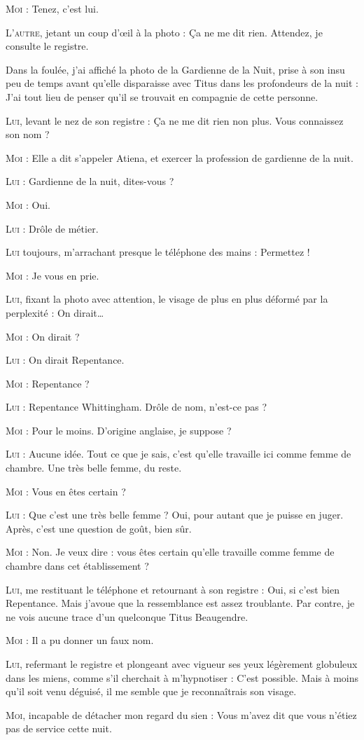 \begin{dialogue}

\textsc{Moi} : Tenez, c’est lui.

\textsc{L’autre}, jetant un coup d’œil à la photo : Ça ne me dit rien. Attendez, je consulte le registre.

Dans la foulée, j’ai affiché la photo de la Gardienne de la Nuit, prise à son insu peu de temps avant qu’elle disparaisse avec Titus dans les profondeurs de la nuit : J’ai tout lieu de penser qu’il se trouvait en compagnie de cette personne.

\textsc{Lui}, levant le nez de son registre : Ça ne me dit rien non plus. Vous connaissez son nom ?

\textsc{Moi} : Elle a dit s’appeler Atiena, et exercer la profession de gardienne de la nuit.

\textsc{Lui} : Gardienne de la nuit, dites-vous ?

\textsc{Moi} : Oui.

\textsc{Lui} : Drôle de métier.

\textsc{Lui} toujours, m’arrachant presque le téléphone des mains : Permettez !

\textsc{Moi} : Je vous en prie.

\textsc{Lui}, fixant la photo avec attention, le visage de plus en plus déformé par la perplexité : On dirait…

\textsc{Moi} : On dirait ?

\textsc{Lui} : On dirait Repentance.

\textsc{Moi} : Repentance ?

\textsc{Lui} : Repentance Whittingham. Drôle de nom, n’est-ce pas ?

\textsc{Moi} : Pour le moins. D’origine anglaise, je suppose ?

\textsc{Lui} : Aucune idée. Tout ce que je sais, c’est qu’elle travaille ici comme femme de chambre. Une très belle femme, du reste.

\textsc{Moi} : Vous en êtes certain ?

\textsc{Lui} : Que c’est une très belle femme ? Oui, pour autant que je puisse en juger. Après, c’est une question de goût, bien sûr.

\textsc{Moi} : Non. Je veux dire : vous êtes certain qu’elle travaille comme femme de chambre dans cet établissement ?

\textsc{Lui}, me restituant le téléphone et retournant à son registre : Oui, si c’est bien Repentance. Mais j’avoue que la ressemblance est assez troublante. Par contre, je ne vois aucune trace d’un quelconque Titus Beaugendre.

\textsc{Moi} : Il a pu donner un faux nom.

\textsc{Lui}, refermant le registre et plongeant avec vigueur ses yeux légèrement globuleux dans les miens, comme s’il cherchait à m’hypnotiser : C’est possible. Mais à moins qu’il soit venu déguisé, il me semble que je reconnaîtrais son visage.

\textsc{Moi}, incapable de détacher mon regard du sien : Vous m’avez dit que vous n’étiez pas de service cette nuit.

\end{dialogue}

